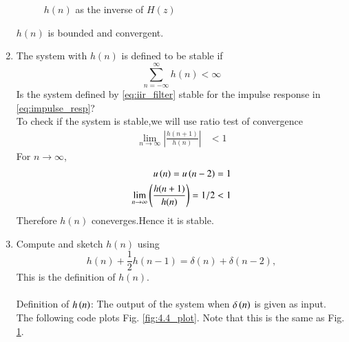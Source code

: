 \documentclass[journal,12pt,twocolumn]{IEEEtran}
\theoremstyle{remark}
\begin{document}
\begin{enumerate}[label=\thesection.\arabic*]
\begin{figure}[H]
\caption{$h(n)$ as the inverse of $H(z)$}
\label{fig:hn}
\end{figure}
$h(n)$ is bounded and convergent.
\item The system with $h(n)$ is defined to be stable if
\begin{equation}
    \label{eq:stabilty_condn}
\sum_{n=-\infty}^{\infty}h(n) < \infty
\end{equation}
Is the system defined by \eqref{eq:iir_filter} stable for the impulse response in \eqref{eq:impulse_resp}?\\
\solution To check if the system is stable,we will use ratio test of convergence
\begin{align}
    \lim_{n \to \infty}\left|\frac{h(n + 1)}{h(n)}\right|&<1 
\end{align}
For $n \to \infty$,
\begin{align}
    u\left(n\right)=u\left(n-2\right)=1 \\
    \lim_{n \to \infty}  \left(\frac{h(n + 1)}{h(n)}\right) = 1/2 <1
\end{align}
Therefore $h(n)$ coneverges.Hence it is stable.

\item 
Compute and sketch $h(n)$ using 
\begin{equation}
\label{eq:iir_filter_h}
h(n) + \frac{1}{2}h(n-1) = \delta(n) + \delta(n-2), 
\end{equation}
%
This is the definition of $h(n)$.
\\
\solution\\
Definition of $h\left(n\right)$: The output of the system when $\delta\left(n\right)$ is given as input.\\

The following code plots Fig. \ref{fig:4.4_plot}. Note that this is the same as Fig. 
\ref{fig:hn}. 


\end{enumerate}
\end{document}
